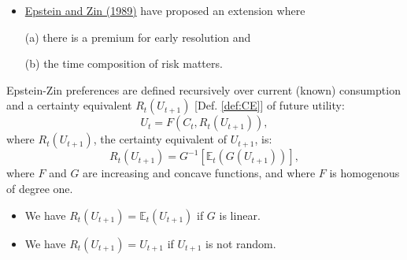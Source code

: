 \begin{frame}{}\label{slide:EpsteinZin_def}
\begin{footnotesize}
\begin{itemize}
	\item \href{https://www.jstor.org/stable/1913778}{Epstein and Zin (1989)} have proposed an extension where
	
	(a) there is a premium for early resolution and
	
	(b) the time composition of risk matters.
\end{itemize}
\begin{defn}
Epstein-Zin preferences are defined recursively over current (known) consumption and a certainty equivalent
$R_t(U_{t+1})$ [Def. \ref{def:CE}] of future utility:
$$
U_{t} = F(C_t,R_t(U_{t+1})),
$$
where $R_t(U_{t+1})$, the certainty equivalent of $U_{t+1}$, is:
$$
R_t(U_{t+1}) = G^{-1}[\mathbb{E}_t(G(U_{t+1}))],
$$
where $F$ and $G$ are increasing and concave functions, and where $F$ is homogenous of degree one.
\end{defn}

\begin{remark}
\begin{itemize}
	\item We have $R_t(U_{t+1})=\mathbb{E}_t(U_{t+1})$ if $G$ is linear.
	\item We have $R_t(U_{t+1})=U_{t+1}$ if $U_{t+1}$ is not random.
\end{itemize}
\end{remark}
\end{footnotesize}
\end{frame}


